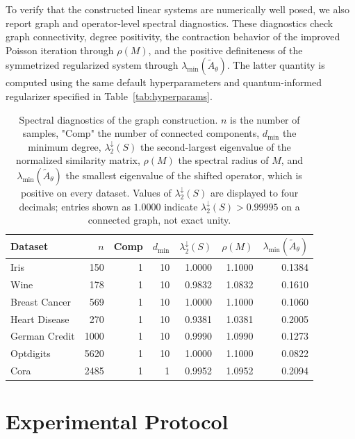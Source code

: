 \documentclass[11pt,a4paper]{article}
\begin{document}
To verify that the constructed linear systems are numerically well posed, we
also report graph and operator-level spectral diagnostics. These diagnostics
check graph connectivity, degree positivity, the contraction behavior of the
improved Poisson iteration through \(\rho(M)\), and the positive definiteness
of the symmetrized regularized system through
\(\lambda_{\min}(\widetilde A_\theta)\). The latter quantity is computed using
the same default hyperparameters and quantum-informed regularizer specified in
Table~\ref{tab:hyperparams}.


\begin{table}[H]
  \centering
  \caption{Spectral diagnostics of the graph construction. $n$ is the number of
  samples, "Comp" the number of connected components, $d_{\min}$ the minimum
  degree, $\lambda_2^{\downarrow}(S)$ the second-largest eigenvalue of the
  normalized similarity matrix, $\rho(M)$ the spectral radius of $M$, and
  $\lambda_{\min}(\widetilde{A}_\theta)$ the smallest eigenvalue of the shifted
  operator, which is positive on every dataset. Values of
  $\lambda_2^{\downarrow}(S)$ are displayed to four decimals; entries shown
  as $1.0000$ indicate $\lambda_2^{\downarrow}(S)>0.99995$ on a connected
  graph, not exact unity.}
  \label{tab:spectral_diagnostics}
  \small
  \setlength{\tabcolsep}{6pt}
  \begin{tabular}{l rrr rrr}
    \toprule
    Dataset & $n$ & Comp & $d_{\min}$
      & $\lambda_2^{\downarrow}(S)$ & $\rho(M)$
      & $\lambda_{\min}(\widetilde{A}_\theta)$ \\
    \midrule
    Iris          & 150  & 1 & 10 & 1.0000 & 1.1000 & 0.1384 \\
    Wine          & 178  & 1 & 10 & 0.9832 & 1.0832 & 0.1610 \\
    Breast Cancer & 569  & 1 & 10 & 1.0000 & 1.1000 & 0.1060 \\
    Heart Disease & 270  & 1 & 10 & 0.9381 & 1.0381 & 0.2005 \\
    German Credit & 1000 & 1 & 10 & 0.9990 & 1.0990 & 0.1273 \\
    Optdigits     & 5620 & 1 & 10 & 1.0000 & 1.1000 & 0.0822 \\
    Cora          & 2485 & 1 & 1  & 0.9952 & 1.0952 & 0.2094 \\
    \bottomrule
  \end{tabular}
\end{table}


\section{Experimental Protocol}
\label{sec:protocol}
\end{document}

